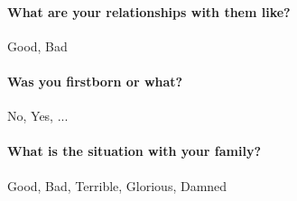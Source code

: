 \documentclass[8pt]{memoir} %
\begin{document}
\paragraph{What are your relationships with them like?} Good, Bad
\paragraph{Was you firstborn or what?} No, Yes, ...
\paragraph{What is the situation with your family?} Good, Bad, Terrible, Glorious, Damned

















\appendix


\ClearShipoutPicture
                   
\end{document}
